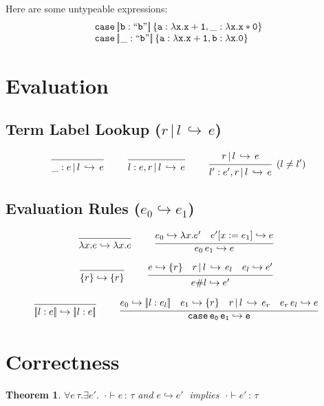\documentclass{article}
\newtheorem{theorem}{Theorem}
\newcommand{\variant}[1]{[\!|#1|\!]}
\newcommand{\case}[2]{\tt{case}\,#1\,#2}
\newcommand{\app}[2]{#1\,#2}
\newcommand{\lam}[2]{\lambda #1 . #2}
\newcommand{\hastp}[3]{#1 \vdash #2 \,:\, #3}
\newcommand{\haslbltm}[3]{#1\,|\,#2\,\hookrightarrow\, #3}
\newcommand{\eval}[2]{#1 \hookrightarrow #2}
\newcommand{\deduct}[3][]
{
  \begin{prooftree}
    \hypo{#2}
    \infer1[\text{#1}]{#3}
  \end{prooftree}
}
\begin{document}
Here are some untypeable expressions:
\[\begin{array}{l}
 \case
   {\variant{b:\tt{``b"}}}
   {\{a:\lam{x}{x + 1},\_:\lam{x}{x * 0}\}}
\\
 \case
   {\variant{\_:\tt{``b"}}}
   {\{a:\lam{x}{x + 1},b:\lam{x}{0}\}}
\end{array}
\]


\section{Evaluation}

\subsection{Term Label Lookup \;($\haslbltm{r}{l}{e}$)}
\[
\deduct
    {}
    {\haslbltm{\_ : e}{l}{e}}
    {}
\qquad
\deduct
    {}
    {\haslbltm{l:e,r}{l}{e}}
    {}
\qquad
\deduct
    {\haslbltm{r}{l}{e}}
    {\haslbltm{l':e',r}{l}{e}}
    {(l \neq l')}
\]

\subsection{Evaluation Rules  \;($\eval{e_0}{e_1}$)}
\[
\deduct
    {}
    {\eval{\lam{x}{e}}{\lam{x}{e}}}
    {}
\qquad
\deduct
    {\eval{e_0}{\lam{x}{e'}}
     \quad
     \eval{e'[x:=e_1]}{e}
    }
    {\eval{\app{e_0}{e_1}}{e}}
    {}
\]

\[
\deduct
    {}
    {\eval{\{r\}}{\{r\}}}
    {}
\qquad
\deduct
    {\eval{e}{\{r\}}
     \quad
     \haslbltm{r}{l}{e_l}
     \quad
     \eval{e_l}{e'}
    }
    {\eval{e\#l}{e'}}
    {}
\]

\[
\deduct
    {}
    {\eval{\variant{l:e}}{\variant{l:e}}}
    {}
\qquad
\deduct
    {\eval{e_0}{\variant{l:e_l}}
     \quad
     \eval{e_1}{\{r\}}
     \quad
     \haslbltm{r}{l}{e_r}
     \quad
     \eval{\app{e_r}{e_l}}{e}
    }
    {\eval{\case{e_0}{e_1}}{e}}
    {}
\]

\section{Correctness}

\begin{theorem}
$\forall e \,\tau . \exists e' . \;\;\hastp{\cdot}{e}{\tau}$ and $\eval{e}{e'}\;$ implies $\;\hastp{\cdot}{e'}{\tau}$
\end{theorem}
\end{document}
